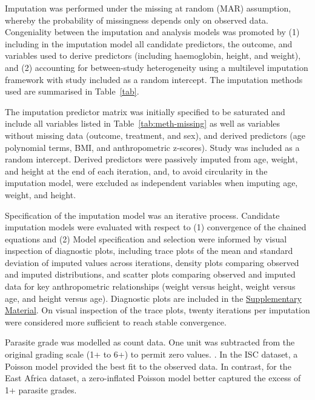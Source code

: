 Imputation was performed under the missing at random (MAR) assumption, whereby the probability of missingness depends only on observed data\cite{rubin1987}.  Congeniality between the imputation and analysis models was promoted by (1) including in the imputation model all candidate predictors, the outcome, and variables used to derive predictors (including haemoglobin, height, and weight), and (2) accounting for between-study heterogeneity using a multilevel imputation framework with study included as a random intercept\cite{white2011}. The imputation methods used are summarised in Table~\ref{tab}.



The imputation predictor matrix was initially specified to be saturated and include all variables listed in Table~\ref{tab:meth-missing} as well as variables without missing data (outcome, treatment, and sex), and derived predictors (age polynomial terms, BMI, and anthropometric z-scores). Study was included as a random intercept. Derived predictors were passively imputed from age, weight, and height at the end of each iteration, and, to avoid circularity in the imputation model, were excluded as independent variables when imputing age, weight, and height.

Specification of the imputation model was an iterative process. Candidate imputation models were evaluated with respect to (1) convergence of the chained equations and (2)  Model specification and selection were informed by visual inspection of diagnostic plots, including trace plots of the mean and standard deviation of imputed values across iterations, density plots comparing observed and imputed distributions, and scatter plots comparing observed and imputed data for key anthropometric relationships (weight versus height, weight versus age, and height versus age). Diagnostic plots are included in the \href{https://github.com/jpwil/dphil}{Supplementary Material}. On visual inspection of the trace plots, twenty iterations per imputation were considered more sufficient to reach stable convergence.

Parasite grade was modelled as count data. One unit was subtracted from the original grading scale (1+ to 6+) to permit zero values. . In the ISC dataset, a Poisson model provided the best fit to the observed data. In contrast, for the East Africa dataset, a zero-inflated Poisson model better captured the excess of 1+ parasite grades.

